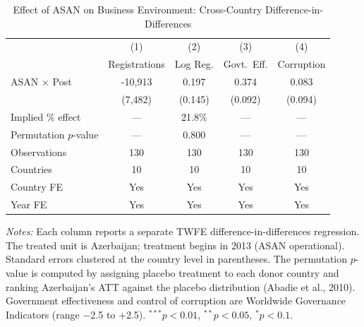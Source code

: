 \begin{table}[htbp]
\centering
\caption{Effect of ASAN on Business Environment: Cross-Country Difference-in-Differences}
\label{tab:did_results}
\begin{tabular}{lcccc}
\hline\hline
 & (1) & (2) & (3) & (4) \\
 & Registrations & Log Reg. & Govt.\ Eff. & Corruption \\
\hline
ASAN $\times$ Post & -10,913 & 0.197 & 0.374 & 0.083 \\
 & (7,482) & (0.145) & (0.092) & (0.094) \\
Implied \% effect & --- & 21.8\% & --- & --- \\
Permutation $p$-value & --- & 0.800 & --- & --- \\
\hline
Observations & 130 & 130 & 130 & 130 \\
Countries & 10 & 10 & 10 & 10 \\
Country FE & Yes & Yes & Yes & Yes \\
Year FE & Yes & Yes & Yes & Yes \\
\hline\hline
\end{tabular}
\par\vspace{0.3em}
{\footnotesize \textit{Notes:} Each column reports a separate TWFE difference-in-differences regression. The treated unit is Azerbaijan; treatment begins in 2013 (ASAN operational). Standard errors clustered at the country level in parentheses. The permutation $p$-value is computed by assigning placebo treatment to each donor country and ranking Azerbaijan's ATT against the placebo distribution (Abadie et al., 2010). Government effectiveness and control of corruption are Worldwide Governance Indicators (range $-$2.5 to $+$2.5). $^{***} p<0.01$, $^{**} p<0.05$, $^{*} p<0.1$.}
\end{table}
